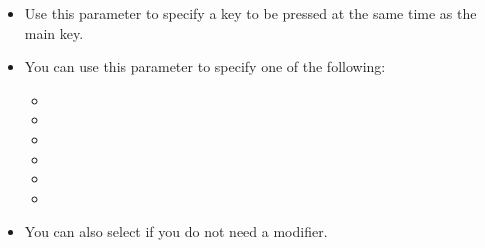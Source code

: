 \begin{itemize}
\item Use this parameter to specify a key to be pressed at the same time as the main key. 
\item You can use this parameter to specify one of the following:
\begin{itemize}
\item {}
\item {}
\item {}
\item {}
\item {}
\item {}
\end{itemize}
\item You can also select  if you do not need a modifier.


\end{itemize}
 


